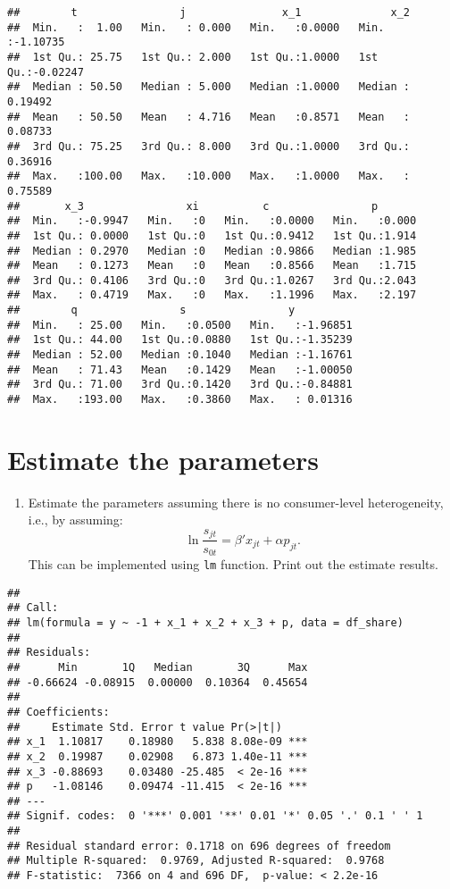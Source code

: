 \documentclass[
]{book}
\providecommand{\tightlist}{%
  \setlength{\itemsep}{0pt}\setlength{\parskip}{0pt}}
\begin{document}
\begin{verbatim}
##        t                j               x_1              x_2          
##  Min.   :  1.00   Min.   : 0.000   Min.   :0.0000   Min.   :-1.10735  
##  1st Qu.: 25.75   1st Qu.: 2.000   1st Qu.:1.0000   1st Qu.:-0.02247  
##  Median : 50.50   Median : 5.000   Median :1.0000   Median : 0.19492  
##  Mean   : 50.50   Mean   : 4.716   Mean   :0.8571   Mean   : 0.08733  
##  3rd Qu.: 75.25   3rd Qu.: 8.000   3rd Qu.:1.0000   3rd Qu.: 0.36916  
##  Max.   :100.00   Max.   :10.000   Max.   :1.0000   Max.   : 0.75589  
##       x_3                xi          c                p        
##  Min.   :-0.9947   Min.   :0   Min.   :0.0000   Min.   :0.000  
##  1st Qu.: 0.0000   1st Qu.:0   1st Qu.:0.9412   1st Qu.:1.914  
##  Median : 0.2970   Median :0   Median :0.9866   Median :1.985  
##  Mean   : 0.1273   Mean   :0   Mean   :0.8566   Mean   :1.715  
##  3rd Qu.: 0.4106   3rd Qu.:0   3rd Qu.:1.0267   3rd Qu.:2.043  
##  Max.   : 0.4719   Max.   :0   Max.   :1.1996   Max.   :2.197  
##        q                s                y           
##  Min.   : 25.00   Min.   :0.0500   Min.   :-1.96851  
##  1st Qu.: 44.00   1st Qu.:0.0880   1st Qu.:-1.35239  
##  Median : 52.00   Median :0.1040   Median :-1.16761  
##  Mean   : 71.43   Mean   :0.1429   Mean   :-1.00050  
##  3rd Qu.: 71.00   3rd Qu.:0.1420   3rd Qu.:-0.84881  
##  Max.   :193.00   Max.   :0.3860   Max.   : 0.01316
\end{verbatim}

\hypertarget{estimate-the-parameters}{%
\section{Estimate the parameters}\label{estimate-the-parameters}}

\begin{enumerate}
\def\labelenumi{\arabic{enumi}.}
\tightlist
\item
  Estimate the parameters assuming there is no consumer-level heterogeneity, i.e., by assuming:
  \[
  \ln \frac{s_{jt}}{s_{0t}} = \beta' x_{jt} + \alpha p_{jt}.
  \]
  This can be implemented using \texttt{lm} function. Print out the estimate results.
\end{enumerate}

\begin{verbatim}
## 
## Call:
## lm(formula = y ~ -1 + x_1 + x_2 + x_3 + p, data = df_share)
## 
## Residuals:
##      Min       1Q   Median       3Q      Max 
## -0.66624 -0.08915  0.00000  0.10364  0.45654 
## 
## Coefficients:
##     Estimate Std. Error t value Pr(>|t|)    
## x_1  1.10817    0.18980   5.838 8.08e-09 ***
## x_2  0.19987    0.02908   6.873 1.40e-11 ***
## x_3 -0.88693    0.03480 -25.485  < 2e-16 ***
## p   -1.08146    0.09474 -11.415  < 2e-16 ***
## ---
## Signif. codes:  0 '***' 0.001 '**' 0.01 '*' 0.05 '.' 0.1 ' ' 1
## 
## Residual standard error: 0.1718 on 696 degrees of freedom
## Multiple R-squared:  0.9769,	Adjusted R-squared:  0.9768 
## F-statistic:  7366 on 4 and 696 DF,  p-value: < 2.2e-16
\end{verbatim}
\end{document}
